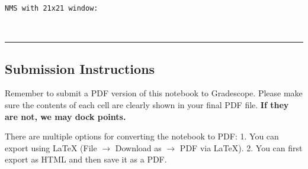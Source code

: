 \documentclass[11pt]{article}
\begin{document}
    \begin{Verbatim}[commandchars=\\\{\}]
NMS with 21x21 window:
    \end{Verbatim}

    \begin{center}
    \end{center}
    { \hspace*{\fill} \\}
    
    \begin{center}\rule{0.5\linewidth}{\linethickness}\end{center}

\hypertarget{submission-instructions}{%
\subsection{Submission Instructions}\label{submission-instructions}}

Remember to submit a PDF version of this notebook to Gradescope. Please
make sure the contents of each cell are clearly shown in your final PDF
file. \textbf{If they are not, we may dock points.}

There are multiple options for converting the notebook to PDF: 1. You
can export using LaTeX (File \(\rightarrow\) Download as \(\rightarrow\)
PDF via LaTeX). 2. You can first export as HTML and then save it as a
PDF.


    
    
    
\end{document}
